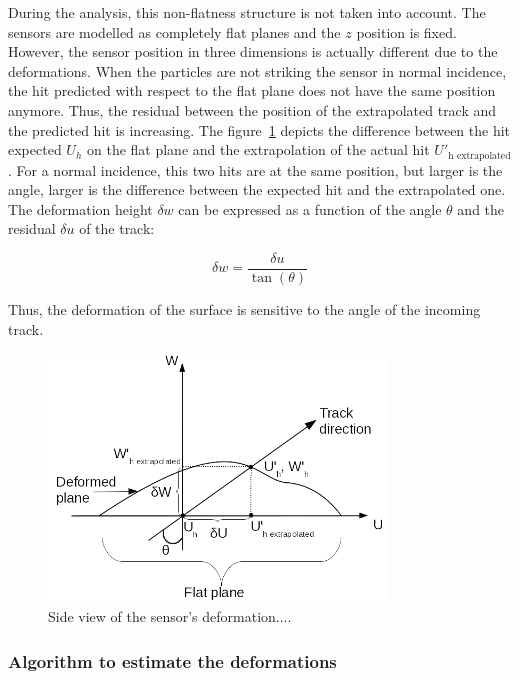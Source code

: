       During the analysis, this non-flatness structure is not taken into account.
      The sensors are modelled as completely flat planes and the $z$ position is fixed.
      However, the sensor position in three dimensions is actually different due to the deformations.
      When the particles are not striking the sensor in normal incidence, the hit predicted with respect to the flat plane does not have the same position anymore.
      Thus, the residual between the position of the extrapolated track and the predicted hit is increasing.
      The figure~\ref{fig:originDef} depicts the difference between the hit expected $U_{h}$ on the flat plane and the extrapolation of the actual hit $U'_{\text{h extrapolated}}$.
      For a normal incidence, this two hits are at the same position, but larger is the angle, larger is the difference between the expected hit and the extrapolated one.
      The deformation height $\delta w$ can be expressed as a function of the angle $\theta$ and the residual $\delta u$ of the track:

      \begin{equation}
        \delta w = \frac{\delta u}{\tan(\theta)}
      \end{equation}

      Thus, the deformation of the surface is sensitive to the angle of the incoming track.

      \begin{figure}[!h]
      \centering
        \includegraphics[width = 0.8\textwidth]{Pictures/deformation/origin_deformation.png}
        \caption{Side view of the sensor's deformation....}
        \label{fig:originDef}
      \end{figure}

      \subsubsection{Algorithm to estimate the deformations}

